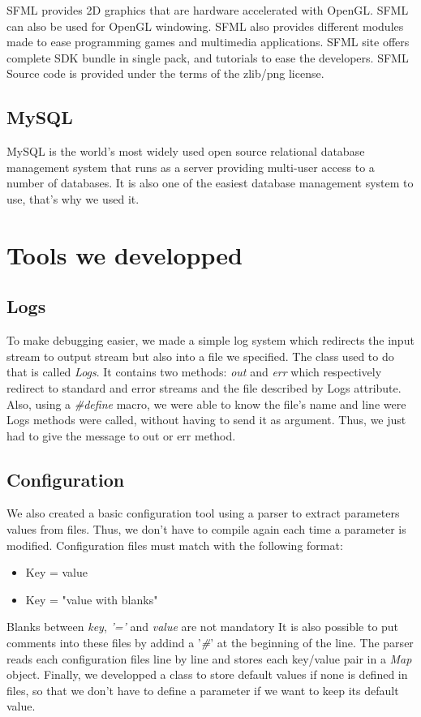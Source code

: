 \documentclass{scrreprt}
\begin{document}
		  SFML provides 2D graphics that are hardware accelerated with OpenGL. SFML can also be used for OpenGL windowing. SFML also provides different modules made to ease programming games and multimedia applications. SFML site offers complete SDK bundle in single pack, and tutorials to ease the developers. SFML Source code is provided under the terms of the zlib/png license.

		  \subsection{MySQL}
		  MySQL is the world's most widely used open source relational database management system that runs as a server providing multi-user access to a number of databases. It is also one of the easiest database management system to use, that's why we used it. 
		  \section{Tools we developped} 
		  \subsection{Logs}
		  To make debugging easier, we made a simple log system which redirects the input stream to output stream but also into a file we specified. The class used to do that is called \emph{Logs}. It contains two methods: \emph{out} and \emph{err} which respectively redirect to standard and error streams and the file described by Logs attribute. Also, using a \emph{\#define} macro, we were able to know the file's name and line were Logs methods were called, without having to send it as argument. Thus, we just had to give the message to out or err method.
		  \subsection{Configuration}
		  We also created a basic configuration tool using a parser to extract parameters values from files. Thus, we don't have to compile again each time a parameter is modified. Configuration files must match with the following format:
		  \begin{itemize}
		  \item{Key = value}
		  \item{Key = "value with blanks"}
		  \end{itemize}
		
		  Blanks between \emph{key}, \emph{'='} and \emph{value} are not mandatory
		  It is also possible to put comments into these files by addind a '\emph{\#}' at the beginning of the line. The parser reads each configuration files line by line and stores each key/value pair in a \emph{Map} object. Finally, we developped a class to store default values if none is defined in files, so that we don't have to define a parameter if we want to keep its default value.
\end{document}
